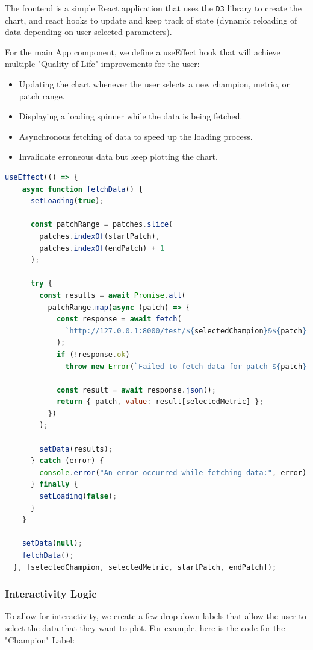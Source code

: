 \documentclass{article}
\begin{document}
The frontend is a simple React application that uses the 
\texttt{D3} library to create the chart, and react hooks to update 
and keep track of state (dynamic reloading of data depending on user
selected parameters).

For the main App component, we define a useEffect hook that will achieve
multiple "Quality of Life" improvements for the user:
\begin{itemize}
  \item Updating the chart whenever the user selects a new champion, metric, or patch range.
  \item Displaying a loading spinner while the data is being fetched.
  \item Asynchronous fetching of data to speed up the loading process.
  \item Invalidate erroneous data but keep plotting the chart.
\end{itemize}

\begin{lstlisting}[language=Javascript]
useEffect(() => {
    async function fetchData() {
      setLoading(true);

      const patchRange = patches.slice(
        patches.indexOf(startPatch),
        patches.indexOf(endPatch) + 1
      );

      try {
        const results = await Promise.all(
          patchRange.map(async (patch) => {
            const response = await fetch(
              `http://127.0.0.1:8000/test/${selectedChampion}&${patch}`
            );
            if (!response.ok)
              throw new Error(`Failed to fetch data for patch ${patch}`);

            const result = await response.json();
            return { patch, value: result[selectedMetric] };
          })
        );

        setData(results);
      } catch (error) {
        console.error("An error occurred while fetching data:", error);
      } finally {
        setLoading(false);
      }
    }

    setData(null);
    fetchData();
  }, [selectedChampion, selectedMetric, startPatch, endPatch]);
\end{lstlisting}

\subsubsection{Interactivity Logic}
\label{subsubsec:Interactivity Logic}

To allow for interactivity, we create a few drop down labels that allow the user
to select the data that they want to plot. For example, here is the code
for the "Champion" Label:
\end{document}
